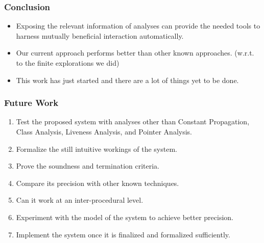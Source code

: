 \begin{frame}
  \frametitle{Conclusion}
    \begin{itemize}
        \item Exposing the relevant information of analyses can provide the needed tools to harness mutually beneficial interaction automatically.

        \item Our current approach performs better than other known approaches. (w.r.t. to the finite explorations we did)

        \item This work has just started and there are a lot of things yet to be done.
    \end{itemize}
\end{frame}


\begin{frame}
  \frametitle{Future Work}
\begin{enumerate}
    \item Test the proposed system with analyses other than Constant Propagation, Class Analysis, Liveness Analysis, and Pointer Analysis.

    \item Formalize the still intuitive workings of the system.

    \item Prove the soundness and termination criteria.

    \item Compare its precision with other known techniques.

    \item Can it work at an inter-procedural level.

    \item Experiment with the model of the system to achieve better precision.

    \item Implement the system once it is finalized and formalized sufficiently.
\end{enumerate}
\end{frame}




